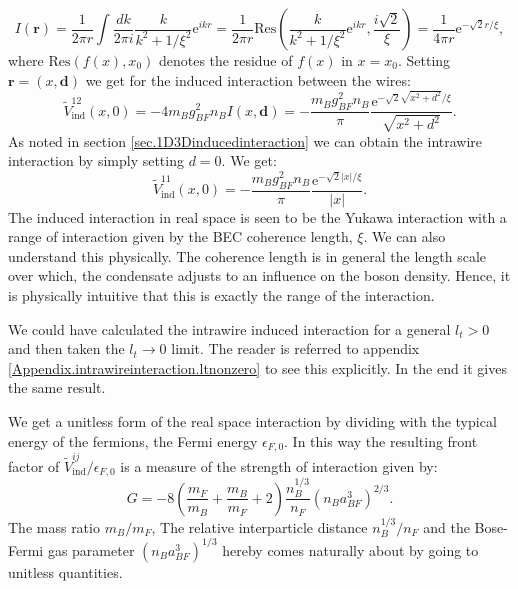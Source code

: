 \begin{equation}
I(\mathbf{r}) = \frac{1}{2\pi r}\int \frac{dk}{2\pi i} \frac{k}{k^2 + 1/\xi^2}\text{e}^{ikr} = \frac{1}{2\pi r}\text{Res}\left(\frac{k}{k^2 + 1/\xi^2}\text{e}^{ikr}, \frac{i\sqrt{2}}{\xi}\right) = \frac{1}{4\pi r} \text{e}^{-\sqrt{2}r/\xi}, \nonumber
\end{equation}
where $\text{Res}(f(x), x_0)$ denotes the residue of $f(x)$ in $x = x_0$. Setting $\mathbf{r} = (x, \mathbf{d})$ we get for the induced interaction between the wires:
\begin{equation}
\tilde{V}^{12}_{\text{ind}}(x, 0) = -4m_Bg^2_{BF}n_B I(x, \mathbf{d}) = -\frac{m_Bg_{BF}^2n_B}{\pi}\frac{\text{e}^{ -\sqrt{2}\sqrt{x^2 + d^2}/\xi }}{\sqrt{x^2 + d^2}}.
\label{eq.V12indx}
\end{equation}
As noted in section \ref{sec.1D3Dinducedinteraction} we can obtain the intrawire interaction by simply setting $d = 0$. We get:
\begin{equation}
\tilde{V}^{11}_{\text{ind}}(x, 0) = -\frac{m_Bg_{BF}^2n_B}{\pi}\frac{\text{e}^{ -\sqrt{2}|x|/\xi }}{|x|}.
\label{eq.V11indx}
\end{equation}
The induced interaction in real space is seen to be the Yukawa interaction with a range of interaction given by the BEC coherence length, $\xi$. We can also understand this physically. The coherence length is in general the length scale over which, the condensate adjusts to an influence on the boson density. Hence, it is physically intuitive that this is exactly the range of the interaction. 

We could have calculated the intrawire induced interaction for a general $l_t > 0$ and then taken the $l_t \to 0$ limit. The reader is referred to appendix \ref{Appendix.intrawireinteraction.ltnonzero} to see this explicitly. In the end it gives the same result. 

We get a unitless form of the real space interaction by dividing with the typical energy of the fermions, the Fermi energy $\epsilon_{F,0}$. In this way the resulting front factor of $\tilde{V}^{ij}_{\text{ind}} / \epsilon_{F,0}$ is a measure of the strength of interaction given by:
\begin{equation}
G = - 8\left( \frac{m_F}{m_B} + \frac{m_B}{m_F} + 2 \right) \frac{n_B^{1/3}}{n_F}(n_Ba_{BF}^3)^{2/3}.
\label{eq.interactionstrength.wires}
\end{equation}
The mass ratio $m_B / m_F$, The relative interparticle distance $n_B^{1/3} / n_F$ and the Bose-Fermi gas parameter $(n_Ba_{BF}^3)^{1/3}$ hereby comes naturally about by going to unitless quantities. 

